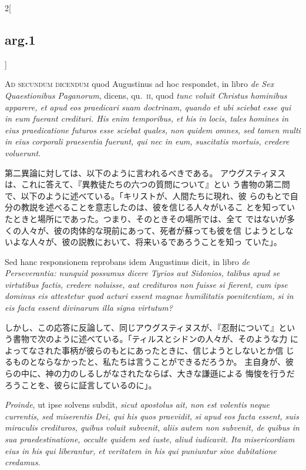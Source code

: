 \documentclass[paper=a4paper,fontsize=10pt,jafontsize=9pt,titlepage]{jlreq}
\begin{document}
\begin{paracol}{2}[\subsection{arg.1}]
\switchcolumn*[\subsection{ad.2}]

{\scshape Ad secundum dicendum} quod Augustinus ad hoc
respondet, in libro 
{\itshape de Sex Quaestionibus Paganorum}, dicens, qu.~{\scshape ii}, quod
{\itshape tunc voluit Christus hominibus apparere, et apud eos praedicari suam
doctrinam, quando et ubi sciebat esse qui in eum fuerant credituri. His
enim temporibus, et his in locis, tales homines in eius praedicatione
futuros esse sciebat quales, non quidem omnes, sed tamen multi in eius
corporali praesentia fuerunt, qui nec in eum, suscitatis mortuis,
credere voluerunt}.

\switchcolumn

第二異論に対しては、以下のように言われるべきである。
アウグスティヌスは、これに答えて、『異教徒たちの六つの質問について』とい
 う書物の第二問で、以下のように述べている。「キリストが、人間たちに現れ、彼
 らのもとで自分の教説を述べることを意志したのは、彼を信じる人々がいるこ
 とを知っていたときと場所にであった。つまり、そのときその場所では、全て
 ではないが多くの人々が、彼の肉体的な現前にあって、死者が蘇っても彼を信
 じようとしないよな人々が、彼の説教において、将来いるであろうことを知っ
 ていた」。

\switchcolumn*

Sed hanc responsionem reprobans idem Augustinus
dicit, in libro {\itshape de Perseverantia: nunquid possumus dicere Tyrios aut
Sidonios, talibus apud se virtutibus factis, credere noluisse, aut
credituros non fuisse si fierent, cum ipse dominus eis attestetur quod
acturi essent magnae humilitatis poenitentiam, si in eis facta essent
divinarum illa signa virtutum?}

\switchcolumn

しかし、この応答に反論して、同じアウグスティヌスが、『忍耐について』とい
 う書物で次のように述べている。「ティルスとシドンの人々が、そのような力
 によってなされた事柄が彼らのもとにあったときに、信じようとしないとか信
 じるものとならなかったと、私たちは言うことができるだろうか。
 主自身が、彼らの中に、神の力のしるしがなされたならば、大きな謙遜による
 悔悛を行うだろうことを、彼らに証言しているのに」。

\switchcolumn*

{\itshape Proinde}, ut ipse solvens subdit, {\itshape sicut
apostolus ait, non est volentis neque currentis, sed miserentis Dei, qui
his quos praevidit, si apud eos facta essent, suis miraculis credituros,
quibus voluit subvenit, aliis autem non subvenit, de quibus in sua
praedestinatione, occulte quidem sed iuste, aliud iudicavit. Ita
misericordiam eius in his qui liberantur, et veritatem in his qui
puniuntur sine dubitatione credamus}.


\end{paracol}
\end{document}
